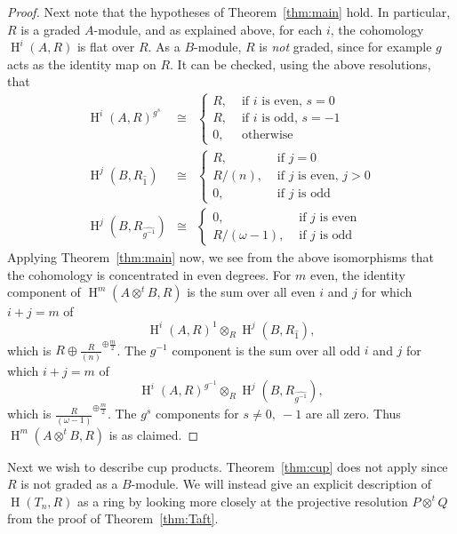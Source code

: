 \documentclass[11pt]{amsart}
\numberwithin{equation}{section}
\theoremstyle{definition}
\theoremstyle{remark}
\newcommand\Homol{\operatorname{H}}
\newcommand\coh{\Homol}
\newcommand\ot{\otimes}
\newcommand\ott{\otimes^{t}\!}
\newcommand{\ttpt}{A\ott B}
\begin{document}
\begin{proof}
Next note that the hypotheses of Theorem~\ref{thm:main} hold.
  In particular, $R$ is a graded $A$-module, and 
as explained above, for each $i$, the cohomology
  $\coh ^i (A,R)$ is flat over $R$.
  As a $B$-module,  $R$ is {\em not} graded, since for example
  $g$ acts as the identity map on $R$. 
  It can be checked, using the above resolutions, that
  \begin{eqnarray*}
 \coh^i(A,R)^{g^s} & \cong & \left\{\begin{array}{rl}
    R , & \mbox{ if $i$ is even, } s = 0\\
    R , & \mbox{ if $i$ is odd, } s= -1 \\
    0 , & \mbox{ otherwise}
    \end{array}\right. \\
 \coh^j(B,R_{\widehat{1}}) & \cong & \left\{\begin{array}{rl}
    R , & \mbox{ if } j = 0\\
    R/(n) , & \mbox{ if $j$ is even, } j>0 \\
    0 , & \mbox{ if $j$ is odd}
    \end{array}\right. \\
 \coh^j(B, R_{\widehat{g^{-1}}}) & \cong & \left\{\begin{array}{rl}
    0, & \mbox{ if $j$ is even}\\
    R/(\omega -1) , & \mbox{ if $j$ is odd} 
    \end{array}\right.
    \end{eqnarray*}
Applying Theorem~\ref{thm:main} now, we see from
the above isomorphisms that 
    the cohomology is concentrated in even degrees.
    For $m$ even, 
    the identity component of $\coh^m(A\ott B, R)$
    is the sum over all even $i$ and $j$ for which $i+j =m$ of 
    \[
    \coh^i(A,R)^1 \ot_R \coh^j(B,R_{\widehat{1}}) ,
    \]
    which is $R\oplus \frac{R}{(n)}^{\oplus \frac{m}{2}}$.
The $g^{-1}$ component
    is the sum over all odd $i$ and $j$ for which $i+j=m$ of
    \[
    \coh^i(A,R)^{g^{-1}}\otimes_R \coh^j(B, R_{\widehat{g^{-1}}}) ,
    \]
    which is $\frac{R}{(\omega - 1)} ^{\oplus \frac{m}{2}}$.
The $g^s$ components for $s\neq 0, \ -1$ are all zero.
Thus $\coh^m (\ttpt , R)$ is as claimed.
\end{proof}

Next we wish to describe cup products. 
Theorem~\ref{thm:cup} does not apply since $R$ is not graded as a $B$-module.
We will instead 
give an explicit description of $\coh(T_n, R)$ as a ring
by looking more closely at the projective resolution $P\ott Q$
from the proof of Theorem~\ref{thm:Taft}.
\end{document}
